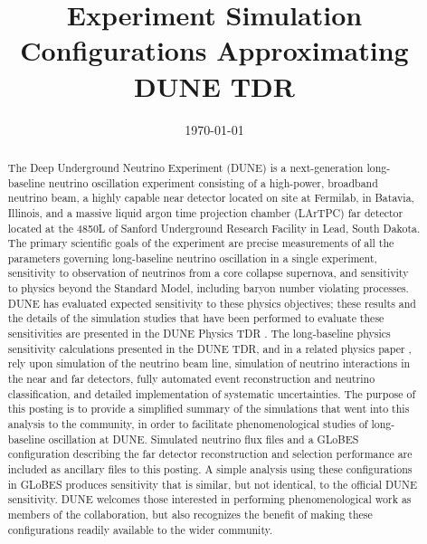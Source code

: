 \documentclass[aps,prd,superscriptaddress]{revtex4-1}
\begin{document}
\title{Experiment Simulation Configurations Approximating DUNE TDR}

\noaffiliation
\date{\today}

\begin{abstract}
  The Deep Underground Neutrino Experiment (DUNE) is a next-generation long-baseline
  neutrino oscillation experiment consisting of a high-power, broadband neutrino beam,
  a highly capable near detector located on site at Fermilab, in Batavia, Illinois,
  and a massive liquid argon
  time projection chamber (LArTPC) far detector located at the 4850L of Sanford
  Underground Research Facility in Lead, South Dakota. The primary scientific goals
  of the experiment are precise measurements of all the parameters governing long-baseline
  neutrino oscillation in a single experiment, sensitivity to observation of neutrinos
  from a core collapse supernova, and sensitivity to physics beyond the Standard Model,
  including baryon number violating processes.
  DUNE has evaluated expected sensitivity to these physics objectives; these results and
  the details of the simulation studies that have been performed to evaluate these sensitivities
  are presented in the DUNE Physics TDR \cite{Abi:2020evt}.
  The long-baseline physics sensitivity calculations presented in the DUNE TDR,
   and in a related physics paper \cite{Abi:2020qib},  
  rely upon
  simulation of the neutrino beam line, simulation of neutrino interactions in the near
  and far detectors, fully automated event reconstruction and neutrino classification,
  and detailed implementation of systematic uncertainties.
  The purpose of this posting is to provide a simplified summary of the
  simulations that went into this analysis to the community, in order to facilitate
  phenomenological studies of long-baseline
  oscillation at DUNE. Simulated neutrino flux files and a GLoBES configuration describing
  the far detector reconstruction and selection performance are included as ancillary files to
  this posting. A simple analysis using these configurations in GLoBES
  produces sensitivity that is similar, but not identical, to the official DUNE sensitivity.
  DUNE welcomes those interested in
  performing phenomenological work as members of the collaboration, but also recognizes
  the benefit of making these configurations readily available to the wider community. 
\end{abstract}


\maketitle
\end{document}
